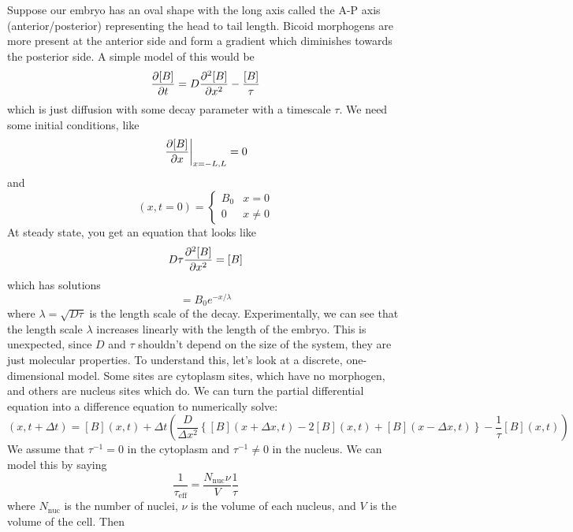 \documentclass[a4paper,twoside,master.tex]{subfiles}
\begin{document}
Suppose our embryo has an oval shape with the long axis called the A-P axis (anterior/posterior) representing the head to tail length. Bicoid morphogens are more present at the anterior side and form a gradient which diminishes towards the posterior side. A simple model of this would be
\begin{equation}
    \pdv{[B]}{t} = D \pdv[2]{[B]}{x} - \frac{[B]}{\tau}
\end{equation}
which is just diffusion with some decay parameter with a timescale $ \tau $. We need some initial conditions, like
\begin{equation}
    \eval{\pdv{[B]}{x}}_{x = -L, L} = 0
\end{equation}
and
\begin{equation}
    [B](x,t=0) = \begin{cases} B_0 & x=0 \\ 0 & x \neq 0 \end{cases}
\end{equation}
At steady state, you get an equation that looks like
\begin{equation}
    D \tau \pdv[2]{[B]}{x} = [B]
\end{equation}
which has solutions
\begin{equation}
    [B] = B_0 e^{-x / \lambda}
\end{equation}
where $ \lambda = \sqrt{D \tau} $ is the length scale of the decay. Experimentally, we can see that the length scale $ \lambda $ increases linearly with the length of the embryo. This is unexpected, since $ D $ and $ \tau $ shouldn't depend on the size of the system, they are just molecular properties. To understand this, let's look at a discrete, one-dimensional model. Some sites are cytoplasm sites, which have no morphogen, and others are nucleus sites which do. We can turn the partial differential equation into a difference equation to numerically solve:
\begin{equation}
    [B](x, t + \Delta t) = [B](x,t) + \Delta t\left( \frac{D}{\Delta x^2} \left\{ [B](x + \Delta x, t) - 2[B](x,t) + [B](x - \Delta x, t) \right\} - \frac{1}{\tau} [B](x,t) \right)
\end{equation}
We assume that $ \tau^{-1} = 0 $ in the cytoplasm and $ \tau^{-1} \neq 0 $ in the nucleus. We can model this by saying
\begin{equation}
    \frac{1}{\tau_{\text{eff}}} = \frac{N_{\text{nuc}} \nu}{V} \frac{1}{\tau}
\end{equation}
where $ N_{\text{nuc}} $ is the number of nuclei, $ \nu $ is the volume of each nucleus, and $ V $ is the volume of the cell. Then
\end{document}
